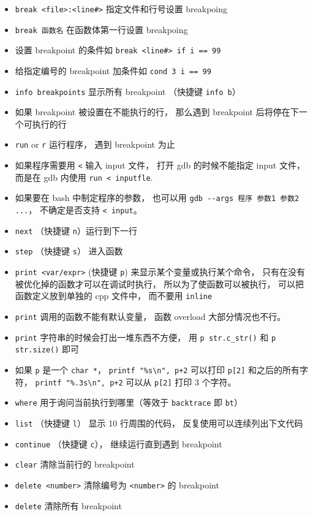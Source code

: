 \begin{itemize}
\item \verb`break <file>:<line#>` 指定文件和行号设置 breakpoing
\item \verb`break 函数名` 在函数体第一行设置 breakpoing
\item 设置 breakpoint 的条件如 \verb`break <line#> if i == 99`
\item 给指定编号的 breakpoint 加条件如 \verb`cond 3 i == 99`
\item \verb`info breakpoints` 显示所有 breakpoint （快捷键 \verb`info b`）
\item 如果 breakpoint 被设置在不能执行的行， 那么遇到 breakpoint 后将停在下一个可执行的行
\item \verb`run` or \verb`r` 运行程序， 遇到 breakpoint 为止
\item 如果程序需要用 \verb`<` 输入 input 文件， 打开 gdb 的时候不能指定 input 文件， 而是在 gdb 内使用 \verb`run < inputfle`.
\item 如果要在 bash 中制定程序的参数， 也可以用 \verb`gdb --args 程序 参数1 参数2 ...`， 不确定是否支持 \verb`< input`。
\item \verb`next` （快捷键 \verb`n`）运行到下一行 
\item \verb`step` （快捷键 \verb`s`） 进入函数
\item \verb`print <var/expr>` (快捷键 \verb`p`) 来显示某个变量或执行某个命令， 只有在没有被优化掉的函数才可以在调试时执行， 所以为了使函数可以被执行， 可以把函数定义放到单独的 cpp 文件中， 而不要用 \verb`inline`
\item \verb`print` 调用的函数不能有默认变量， 函数 overload 大部分情况也不行。
\item \verb`print` 字符串的时候会打出一堆东西不方便， 用 \verb`p str.c_str()` 和 \verb`p str.size()` 即可
\item 如果 \verb`p` 是一个 \verb`char *`， \verb`printf "%s\n", p+2` 可以打印 \verb`p[2]` 和之后的所有字符， \verb`printf "%.3s\n", p+2` 可以从 \verb`p[2]` 打印 3 个字符。
\item \verb`where` 用于询问当前执行到哪里（等效于 \verb`backtrace` 即 \verb`bt`）
\item \verb`list` （快捷键 \verb`l`） 显示 10 行周围的代码， 反复使用可以连续列出下文代码
\item \verb`continue` （快捷键 \verb`c`）， 继续运行直到遇到 breakpoint
\item \verb`clear` 清除当前行的 breakpoint
\item \verb`delete <number>` 清除编号为 \verb`<number>` 的 breakpoint
\item \verb`delete` 清除所有 breakpoint

\end{itemize}
